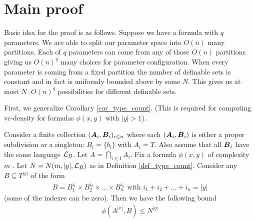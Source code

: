 \documentclass{amsart}
\DeclareMathOperator{\A}{\boldface A}
\DeclareMathOperator{\B}{\boldface B}
\begin{document}
\section{Main proof}

Basic idea for the proof is as follows. Suppose we have a formula with $q$ parameters. We are able to split our parameter space into $O(n)$ many partitions. Each of $q$ parameters can come from any of those $O(n)$ partitions giving us $O(n)^q$ many choices for parameter configuration. When every parameter is coming from a fixed partition the number of definable sets is constant and in fact is uniformly bounded above by some $N$. This gives us at most $N \cdot O(n)^q$ possibilities for different definable sets.

First, we generalize Corollary \ref{cor_type_count}. (This is required for computing vc-density for formulas $\phi(x, y)$ with $|y| > 1$).

\begin{Lemma} \label{lm_partition_bound}
	Consider a finite collection $(\A_i, \B_i)_{i \leq n}$ where each $(\A_i, \B_i)$ is either a proper subdivision or a singleton: $B_i = \{b_i\}$ with $A_i = T$. Also assume that all $\B_i$ have the same language $\mathcal L_B$. Let $A = \bigcap_{i \in I} A_i$. Fix a formula $\phi(x, y)$ of complexity $m$ . Let $N = N(m, |y|, \mathcal L_B)$ as in Definition \ref{def_type_count}. Consider any $B \subseteq T^{|y|}$ of the form
	\begin{align*}
		B = B_1^{i_1} \times B_2^{i_2} \times \ldots \times B_n^{i_n} \text { with } i_1 + i_2 + \ldots + i_n = |y|
	\end{align*}
	(some of the indexes can be zero). Then we have the following bound
	\begin{align*}
		\phi(A^{|x|}, B) \leq N^{|y|}
	\end{align*}
\end{Lemma}
\end{document}

